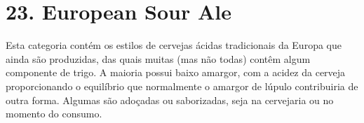\section*{23. European Sour Ale}

Esta categoria contém os estilos de cervejas ácidas tradicionais da Europa que ainda são produzidas, das quais muitas (mas não todas) contêm algum componente de trigo. A maioria possui baixo amargor, com a acidez da cerveja proporcionando o equilíbrio que normalmente o amargor de lúpulo contribuiria de outra forma. Algumas são adoçadas ou saborizadas, seja na cervejaria ou no momento do consumo.